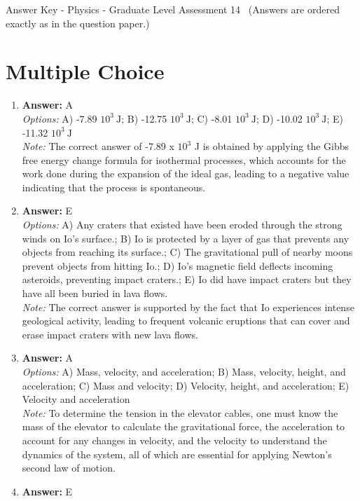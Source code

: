 \documentclass[12pt]{article}
\begin{document}
\begin{center}
Answer Key - Physics - Graduate Level Assessment 14 \
\small (Answers are ordered exactly as in the question paper.)
\end{center}

\section*{Multiple Choice}
\begin{enumerate}[label=\arabic*.]
\item \textbf{Answer:} A
\\ \textit{Options:} A) -7.89 $10^3 \mathrm{~J}$; B) -12.75 $10^3 \mathrm{~J}$; C) -8.01 $10^3 \mathrm{~J}$; D) -10.02 $10^3 \mathrm{~J}$; E) -11.32 $10^3 \mathrm{~J}$
\\ \textit{Note:} The correct answer of -7.89 x $10^3$ J is obtained by applying the Gibbs free energy change formula for isothermal processes, which accounts for the work done during the expansion of the ideal gas, leading to a negative value indicating that the process is spontaneous.
\item \textbf{Answer:} E
\\ \textit{Options:} A) Any craters that existed have been eroded through the strong winds on Io's surface.; B) Io is protected by a layer of gas that prevents any objects from reaching its surface.; C) The gravitational pull of nearby moons prevent objects from hitting Io.; D) Io's magnetic field deflects incoming asteroids, preventing impact craters.; E) Io did have impact craters but they have all been buried in lava flows.
\\ \textit{Note:} The correct answer is supported by the fact that Io experiences intense geological activity, leading to frequent volcanic eruptions that can cover and erase impact craters with new lava flows.
\item \textbf{Answer:} A
\\ \textit{Options:} A) Mass, velocity, and acceleration; B) Mass, velocity, height, and acceleration; C) Mass and velocity; D) Velocity, height, and acceleration; E) Velocity and acceleration
\\ \textit{Note:} To determine the tension in the elevator cables, one must know the mass of the elevator to calculate the gravitational force, the acceleration to account for any changes in velocity, and the velocity to understand the dynamics of the system, all of which are essential for applying Newton's second law of motion.
\item \textbf{Answer:} E

\end{enumerate}
\end{document}
